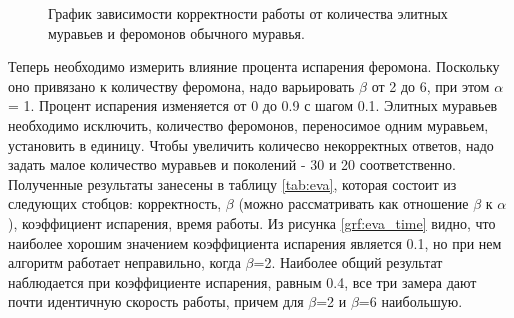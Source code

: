 \documentclass[12pt, a4paper]{report}
\begin{document}
    		\begin{figure}[ht!]
    			\centering
    			\caption{График зависимости корректности работы от количества элитных муравьев и феромонов обычного муравья.}
    			\label{grf:elite_right}
    		\end{figure}
    	
    		
    		Теперь необходимо измерить влияние процента испарения феромона. Поскольку оно привязано к количеству феромона, надо варьировать $\beta$ от 2 до 6, при этом $\alpha$ = 1. Процент испарения изменяется от 0 до 0.9 с шагом 0.1. Элитных муравьев необходимо исключить, количество феромонов, переносимое одним муравьем, установить в единицу. Чтобы увеличить количесво некорректных ответов, надо задать малое количество муравьев и поколений - 30 и 20 соответственно. Полученные результаты занесены в таблицу \ref{tab:eva}, которая состоит из следующих стобцов: корректность, $\beta$ (можно рассматривать как отношение $\beta$ к $\alpha$), коэффициент испарения, время работы. Из рисунка \ref{grf:eva_time} видно, что наиболее хорошим значением коэффициента испарения является 0.1, но при нем алгоритм работает неправильно, когда $\beta$=2. Наиболее общий результат наблюдается при коэффициенте испарения, равным 0.4, все три замера дают почти идентичную скорость работы, причем для $\beta$=2 и $\beta$=6 наибольшую.
    		
\end{document}
